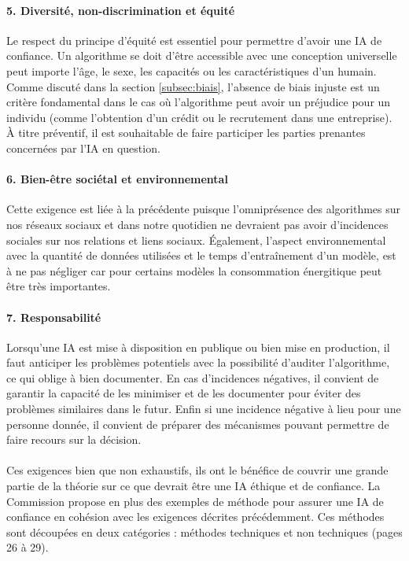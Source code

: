 \documentclass[10pt, french, a4paper]{report}
\begin{document}
\paragraph{5. Diversité, non-discrimination et équité} Le respect du principe d'équité est essentiel pour permettre d'avoir une IA de confiance. Un algorithme se doit d'être accessible avec une conception universelle peut importe l'âge, le sexe, les capacités ou les caractéristiques d'un humain. Comme discuté dans la section \ref{subsec:biais}, l'absence de biais injuste est un critère fondamental dans le cas où l'algorithme peut avoir un préjudice pour un individu (comme l'obtention d'un crédit ou le recrutement dans une entreprise). \uppercase{à} titre préventif, il est souhaitable de faire participer les parties prenantes concernées par l'IA en question.

\paragraph{6. Bien-être sociétal et environnemental} Cette exigence est liée à la précédente puisque l'omniprésence des algorithmes sur nos réseaux sociaux et dans notre quotidien ne devraient pas avoir d'incidences sociales sur nos relations et liens sociaux. \uppercase{é}galement, l'aspect environnemental avec la quantité de données utilisées et le temps d'entraînement d'un modèle, est à ne pas négliger car pour certains modèles la consommation énergitique peut être très importantes.

\paragraph{7. Responsabilité} Lorsqu'une IA est mise à disposition en publique ou bien mise en production, il faut anticiper les problèmes potentiels avec la possibilité d'auditer l'algorithme, ce qui oblige à bien documenter. En cas d'incidences négatives, il convient de garantir la capacité de les minimiser et de les documenter pour éviter des problèmes similaires dans le futur. Enfin si une incidence négative à lieu pour une personne donnée, il convient de préparer des mécanismes pouvant permettre de faire recours sur la décision.

\paragraph{}
Ces exigences bien que non exhaustifs, ils ont le bénéfice de couvrir une grande partie de la théorie sur ce que devrait être une IA éthique et de confiance. La Commission propose en plus des exemples de méthode pour assurer une IA de confiance en cohésion avec les exigences décrites précédemment. Ces méthodes sont découpées en deux catégories : méthodes techniques et non techniques (pages 26 à 29).
\end{document}
